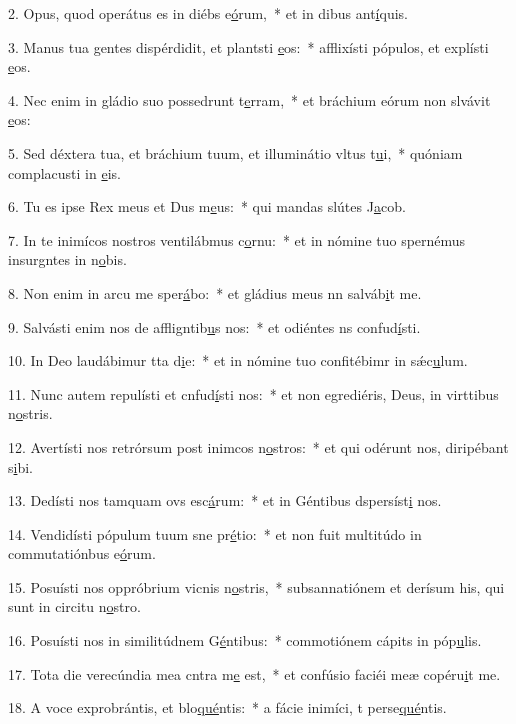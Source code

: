 2. Opus, quod operátus es in diébs e\uline{ó}rum,~* et in dibus ant\uline{í}quis.\par 
3. Manus tua gentes dispérdidit, et plantsti \uline{e}os:~* afflixísti pópulos, et explísti \uline{e}os.\par 
4. Nec enim in gládio suo possedrunt t\uline{e}rram,~* et bráchium eórum non slvávit \uline{e}os:\par 
5. Sed déxtera tua, et bráchium tuum, et illuminátio vltus t\uline{u}i,~* quóniam complacusti in \uline{e}is.\par 
6. Tu es ipse Rex meus et Dus m\uline{e}us:~* qui mandas slútes J\uline{a}cob.\par 
7. In te inimícos nostros ventilábmus c\uline{o}rnu:~* et in nómine tuo spernémus insurgntes in n\uline{o}bis.\par 
8. Non enim in arcu me sper\uline{á}bo:~* et gládius meus nn salváb\uline{i}t me.\par 
9. Salvásti enim nos de affligntib\uline{u}s nos:~* et odiéntes ns confud\uline{í}sti.\par 
10. In Deo laudábimur tta d\uline{i}e:~* et in nómine tuo confitébimr in sǽc\uline{u}lum.\par 
11. Nunc autem repulísti et cnfud\uline{í}sti nos:~* et non egrediéris, Deus, in virttibus n\uline{o}stris.\par 
12. Avertísti nos retrórsum post inimcos n\uline{o}stros:~* et qui odérunt nos, diripébant s\uline{i}bi.\par 
13. Dedísti nos tamquam ovs esc\uline{á}rum:~* et in Géntibus dspersíst\uline{i} nos.\par 
14. Vendidísti pópulum tuum sne pr\uline{é}tio:~* et non fuit multitúdo in commutatiónbus e\uline{ó}rum.\par 
15. Posuísti nos oppróbrium vicnis n\uline{o}stris,~* subsannatiónem et derísum his, qui sunt in circitu n\uline{o}stro.\par 
16. Posuísti nos in similitúdnem G\uline{é}ntibus:~* commotiónem cápits in póp\uline{u}lis.\par 
17. Tota die verecúndia mea cntra m\uline{e} est,~* et confúsio faciéi meæ copéru\uline{i}t me.\par 
18. A voce exprobrántis, et blo\uline{qué}ntis:~* a fácie inimíci, t perse\uline{qué}ntis.\par 
